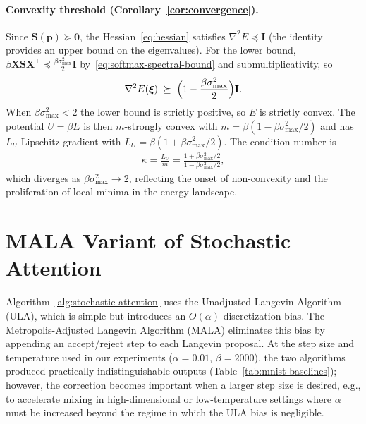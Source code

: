 \paragraph{Convexity threshold (Corollary~\ref{cor:convergence}).}
Since $\mathbf{S}(\mathbf{p})\succeq\mathbf{0}$, the Hessian~\eqref{eq:hessian} satisfies $\nabla^{2}E\preceq\mathbf{I}$ (the identity provides an upper bound on the eigenvalues). For the lower bound, $\beta\mathbf{X}\mathbf{S}\mathbf{X}^{\top}\preceq\tfrac{\beta\sigma_{\max}^{2}}{2}\mathbf{I}$ by~\eqref{eq:softmax-spectral-bound} and submultiplicativity, so
\begin{align*}
\nabla^{2}E(\boldsymbol{\xi})
\;\succeq\; \Bigl(1-\frac{\beta\sigma_{\max}^{2}}{2}\Bigr)\mathbf{I}.
\end{align*}
When $\beta\sigma_{\max}^{2}<2$ the lower bound is strictly positive, so $E$ is strictly convex. The potential $U=\beta E$ is then $m$-strongly convex with $m=\beta(1-\beta\sigma_{\max}^{2}/2)$ and has $L_{U}$-Lipschitz gradient with $L_{U}=\beta(1+\beta\sigma_{\max}^{2}/2)$. The condition number is
\begin{align*}
\kappa = \frac{L_{U}}{m}
= \frac{1+\beta\sigma_{\max}^{2}/2}{1-\beta\sigma_{\max}^{2}/2},
\end{align*}
which diverges as $\beta\sigma_{\max}^{2}\to 2$, reflecting the onset of non-convexity and the proliferation of local minima in the energy landscape.


\section{MALA Variant of Stochastic Attention}\label{app:mala-algorithm}

Algorithm~\ref{alg:stochastic-attention} uses the Unadjusted Langevin Algorithm (ULA), which is simple but introduces an $O(\alpha)$ discretization bias. The Metropolis-Adjusted Langevin Algorithm (MALA) eliminates this bias by appending an accept/reject step to each Langevin proposal. At the step size and temperature used in our experiments ($\alpha{=}0.01$, $\beta{=}2000$), the two algorithms produced practically indistinguishable outputs (Table~\ref{tab:mnist-baselines}); however, the correction becomes important when a larger step size is desired, e.g., to accelerate mixing in high-dimensional or low-temperature settings where $\alpha$ must be increased beyond the regime in which the ULA bias is negligible.

